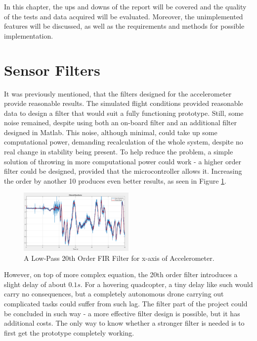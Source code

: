 In this chapter, the ups and downs of the report will be covered and the quality of the tests and data acquired will be evaluated. Moreover, the unimplemented features will be discussed, as well as the requirements and methods for possible implementation.
\section{Sensor Filters}
It was previously mentioned, that the filters designed for the accelerometer provide reasonable results. The simulated flight conditions provided reasonable data to design a filter that would suit a fully functioning prototype. 
Still, some noise remained, despite using both an on-board filter and an additional filter designed in Matlab. This noise, although minimal, could take up some computational power, demanding recalculation of the whole system, despite no real change in stability being present.
To help reduce the problem, a simple solution of throwing in more computational power could work - a higher order filter could be designed, provided that the microcontroller allows it.
Increasing the order by another 10 produces even better results, as seen in Figure \ref{newFilter}.

\begin{figure}[H]
  \centering
    \includegraphics[width=0.5\textwidth]{images/newFilter.png}
	\caption{A Low-Pass 20th Order FIR Filter for x-axis of Accelerometer.}
	\label{newFilter}
\end{figure}

However, on top of more complex equation, the 20th order filter introduces a slight delay of about $0.1s$. For a hovering quadcopter, a tiny delay like such would carry no consequences, but a completely autonomous drone carrying out complicated tasks could suffer from such lag.
The filter part of the project could be concluded in such way - a more effective filter design is possible, but it has additional costs. The only way to know whether a stronger filter is needed is to first get the prototype completely working.

